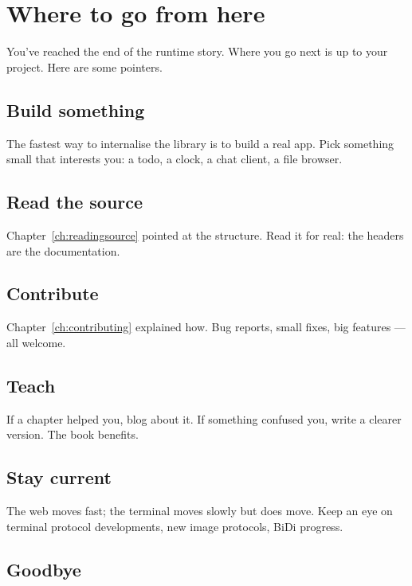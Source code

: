 \chapter{Where to go from here}
\label{ch:nextsteps}

\begin{aside}
You've reached the end of the runtime story. Where you go
next is up to your project. Here are some pointers.
\end{aside}

\section{Build something}

The fastest way to internalise the library is to build a
real app. Pick something small that interests you: a
todo, a clock, a chat client, a file browser.

\section{Read the source}

Chapter~\ref{ch:readingsource} pointed at the structure.
Read it for real: the headers are the documentation.

\section{Contribute}

Chapter~\ref{ch:contributing} explained how. Bug reports,
small fixes, big features --- all welcome.

\section{Teach}

If a chapter helped you, blog about it. If something
confused you, write a clearer version. The book benefits.

\section{Stay current}

The web moves fast; the terminal moves slowly but does
move. Keep an eye on terminal protocol developments,
new image protocols, BiDi progress.

\section{Goodbye}


